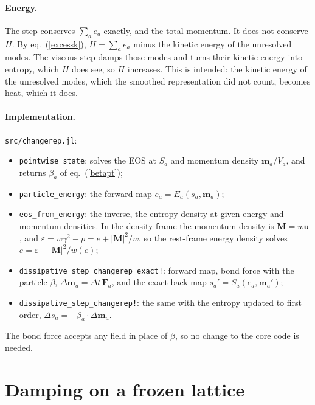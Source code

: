 \documentclass[11pt,aps,preprint,nofootinbib,superscriptaddress,tightenlines]{revtex4-2}
\def\Eq#1{eq.~(\ref{#1})}
\let\oldparagraph\paragraph
\renewcommand{\paragraph}{\par\bigskip\oldparagraph}
\begin{document}
\paragraph{Energy.}  The step conserves $\sum_ae_a$ exactly, and the total
momentum.  It does not conserve $H$.  By \Eq{excessk}, $H=\sum_ae_a$ minus the
kinetic energy of the unresolved modes.  The viscous step damps those modes and
turns their kinetic energy into entropy, which $H$ does see, so $H$ increases.
This is intended: the kinetic energy of the unresolved modes, which the
smoothed representation did not count, becomes heat, which it does.

\paragraph{Implementation.}  \texttt{src/changerep.jl}:
\begin{itemize}
\item \texttt{pointwise\_state}: solves the EOS at $S_a$ and momentum density
  $\bm m_a/V_a$, and returns $\beta_a$ of \Eq{betapt};
\item \texttt{particle\_energy}: the forward map $e_a=E_a(s_a,\bm m_a)$;
\item \texttt{eos\_from\_energy}: the inverse, the entropy density at given
  energy and momentum densities.  In the density frame the momentum density is
  $\bm M=w\bm u$, and $\varepsilon=w\gamma^2-p=e+|\bm M|^2/w$, so the rest-frame
  energy density solves $e=\varepsilon-|\bm M|^2/w(e)$;
\item \texttt{dissipative\_step\_changerep\_exact!}: forward map, bond force with
  the particle $\beta$, $\Delta\bm m_a=\Delta t\,\bm F_a$, and the exact back map
  $s_a'=S_a(e_a,\bm m_a')$;
\item \texttt{dissipative\_step\_changerep!}: the same with the entropy updated
  to first order, $\Delta s_a=-\beta_a\cdot\Delta\bm m_a$.
\end{itemize}
The bond force accepts any field in place of $\beta$, so no change to the core
code is needed.

\section{Damping on a frozen lattice}
\label{sec:damping}
\end{document}

